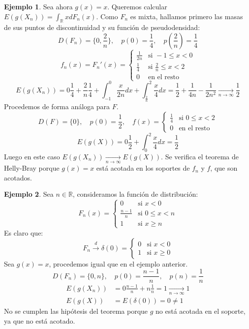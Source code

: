 \documentclass{report}
\theoremstyle{remark}
\theoremstyle{remark}
\theoremstyle{remark}
\theoremstyle{definition}
\theoremstyle{definition}
\theoremstyle{definition}
\newtheorem*{example}{Ejemplo}
\theoremstyle{definition}
\begin{document}
\begin{example}
    Sea ahora $g(x) = x$.
    Queremos calcular $E(g(X_n)) = \int_\mathbb{R} x dF_n(x)$.
    Como $F_n$ es mixta, hallamos primero las masas de sus puntos de discontinuidad y su función de pseudodensidad:
    $$D(F_n) = \{0, \frac{2}{n}\}, \quad p(0) = \frac{1}{4}, \quad p(\frac{2}{n}) = \frac{1}{4}$$
    $$f_n(x) = F_n'(x) = \begin{cases}
            \frac{1}{2n} & \text{si } -1 \leq x < 0          \\
            \frac{1}{4}  & \text{si } \frac{2}{n} \leq x < 2 \\
            0            & \text{en el resto}
        \end{cases}$$
    $$E(g(X_n)) = 0 \frac{1}{4} + \frac{2}{n} \frac{1}{4} + \int_{-1}^0 \frac{x}{2n}dx + \int_\frac{2}{n}^2 \frac{x}{4}dx = \frac{1}{2} + \frac{1}{4n} - \frac{1}{2n^2} \xrightarrow[n \to \infty]{} \frac{1}{2}$$
    Procedemos de forma análoga para $F$.
    $$D(F) = \{0\}, \quad p(0) = \frac{1}{2}, \quad
        f(x) = \begin{cases}
            \frac{1}{4} & \text{si } 0 \leq x < 2 \\
            0           & \text{en el resto}
        \end{cases}$$
    $$E(g(X)) = 0 \frac{1}{2} + \int_0^2 \frac{x}{4}dx = \frac{1}{2}$$
    Luego en este caso $E(g(X_n)) \xrightarrow[n \to \infty]{} E(g(X))$.
    Se verifica el teorema de Helly-Bray porque $g(x) = x$ está acotada en los soportes de $f_n$ y $f$, que son acotados.
\end{example}

\begin{example}
    Sea $n \in \mathbb{R}$, consideramos la función de distribución:
    $$F_n(x) = \begin{cases}
            0             & \text{si } x < 0        \\
            \frac{n-1}{n} & \text{si } 0 \leq x < n \\
            1             & \text{si } x \geq n
        \end{cases}$$
    Es claro que:
    $$F_n \xrightarrow{d} \delta(0) = \begin{cases}
            0 & \text{si } x < 0    \\
            1 & \text{si } x \geq 0
        \end{cases}$$
    Sea $g(x) = x$, procedemos igual que en el ejemplo anterior.
    $$D(F_n) = \{0, n\}, \quad p(0) = \frac{n-1}{n}, \quad p(n) = \frac{1}{n}$$
    \begin{align*}
        E(g(X_n)) & = 0 \frac{n-1}{n} + n \frac{1}{n} = 1 \xrightarrow[n \to \infty]{} 1 \\
        E(g(X))   & = E(\delta(0)) = 0 \neq 1
    \end{align*}
    No se cumplen las hipótesis del teorema porque $g$ no está acotada en el soporte, ya que no está acotado.
\end{example}
\end{document}

